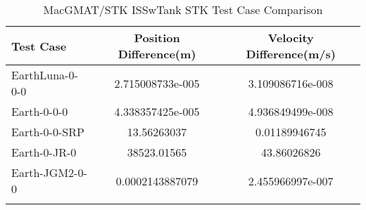\begin{table}[htbp!]
\centering
\caption{ MacGMAT/STK ISSwTank STK Test Case Comparison}
      \begin{tabular}{lcc}
      \hline\hline
          Test Case & Position Difference(m) & Velocity Difference(m/s) \\
         \hline
         EarthLuna-0-0-0 & 2.715008733e-005 & 3.109086716e-008 \\
         Earth-0-0-0 & 4.338357425e-005 & 4.936849499e-008 \\
         Earth-0-0-SRP & 13.56263037 & 0.01189946745 \\
         Earth-0-JR-0 & 38523.01565 & 43.86026826 \\
         Earth-JGM2-0-0 & 0.0002143887079 & 2.455966997e-007 \\
      \hline\hline
      \label{Table: ISSwTank STK Table} 
\end{tabular}
\end{table}
